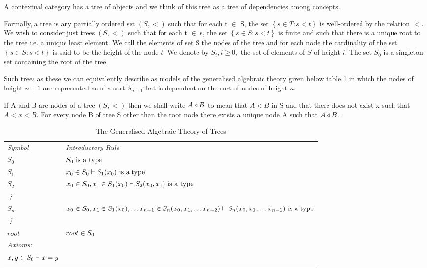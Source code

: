 \documentclass[10pt,a4paper]{article}
\begin{document}
A contextual category has a tree of objects and we think of this tree as a tree of dependencies among concepts. 

Formally, a tree is any partially ordered set $(S, <)$ such that for each t $\in$ S, the set $\left\{ s \in T : s < t \right\} $ is well-ordered by the relation $<$. We wish to consider just trees $(S,<)$ 
such that for each t $\in$ s, the set $\left\{s \in S : s < t\right\}$ is finite  and such that there is a unique root to the tree i.e. a unique least element. We call the elements of set S the nodes of the tree and for each node the cardinality of the set $\left\{s \in S : s < t\right\}$ is said to be the height of the 
node $t$. We denote by $S_i, i \geq 0,$ the set of elements of $S$ of height $i$. The set $S_0$ is a singleton set containing the root of the tree.

Such trees as these we can equivalently describe as models of the generalised algebraic theory given below table \ref{GATOFTREES} in which the nodes of height $n+1$ are represented as of a sort $S_{n+1}$that is dependent on the sort of nodes of height $n$.

\newcommand{\Ft}[1]{\downarrow \kern -0.325em #1}
If A and B are nodes of  a tree $(S,<)$ then we shall write $A \triangleleft B$ to mean that $A < B$ in S and that
there does not exist x such that $A < x < B$. For every node B of tree S other than the root node there exists a unique node A such that $A \triangleleft B$.

\newcommand{\Sz}{S_0}
\newcommand{\ofS}[1]{\ofT{#1}{\Sz}}
\newcommand{\Si}[1]{S_{#1}}
\newcommand{\ofSi}[3]{\ofT{#1}{\Si{#2}(#3)}}
\vspace{0.03cm} 
\begin{table}[H]
\caption{The Generalised Algebraic Theory of Trees}
\label{GATOFTREES}
\begin{tabular}{>{\itshape}l l}
Symbol & \itshape{Introductory Rule} \\
$\Sz  $&$\isT{\Sz}$\\
$\Si{1} $&$\ofS{x_0} \tstyle \isT{\Si{1}(x_0)} $\\
$\Si{2} $&$\ofS{x_0},\ofSi{x_1}{1}{x_0} \tstyle \isT{\Si{2}(x_0,x_1)} $\\
\vdots  \\
$\Si{n} $&$\ofS{x_0},\ofSi{x_1}{1}{x_0}, \hdots \ofSi{x_{n-1}}{n}{x_0,x_1,\hdots x_{n-2}} \tstyle \isT{\Si{n}(x_0,x_1,\hdots x_{n-1})} $\\
\vdots   \\
$root$ & $\ofT{root}{\Sz}$ \\
\itshape{Axioms}:  \\
$\ofT{x,y}{\Sz} \tstyle x = y$
\end{tabular} \\
\end{table} 
\end{document}
